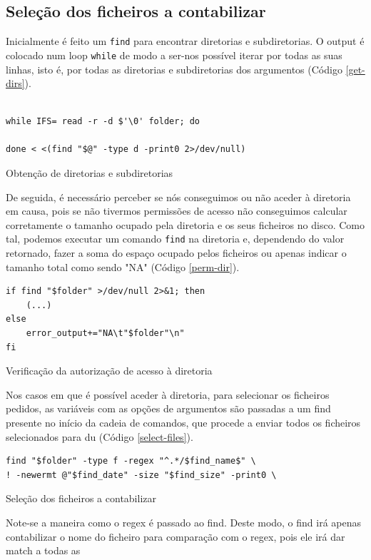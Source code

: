 \subsection{Seleção dos ficheiros a contabilizar}
Inicialmente é feito um \verb|find| para encontrar
diretorias e subdiretorias. O output é colocado num loop
\verb|while| de modo a ser-nos possível iterar por todas as
suas linhas, isto é, por todas as diretorias e
subdiretorias dos argumentos (Código \ref{get-dirs}).
\begin{listing}[H]
\begin{verbatim}

while IFS= read -r -d $'\0' folder; do 

done < <(find "$@" -type d -print0 2>/dev/null)
\end{verbatim}
\caption{Obtenção de diretorias e subdiretorias}
\label{get-dirs}
\end{listing}
De seguida, é necessário perceber se nós conseguimos ou não
aceder à diretoria em causa, pois se não tivermos permissões
de acesso não conseguimos calcular corretamente o tamanho
ocupado pela diretoria e os seus ficheiros no disco. Como
tal, podemos executar um comando \verb|find| na diretoria
e, dependendo do valor retornado, fazer a soma do espaço
ocupado pelos ficheiros ou apenas indicar o tamanho total
como sendo "NA" (Código \ref{perm-dir}).
\begin{listing}[H]
\begin{verbatim}
if find "$folder" >/dev/null 2>&1; then
    (...)
else
    error_output+="NA\t"$folder"\n"
fi
\end{verbatim}
\caption{Verificação da autorização de acesso à diretoria}
\label{perm-dir}
\end{listing}
Nos casos em que é possível aceder à diretoria, para
selecionar os ficheiros pedidos, as variáveis com as opções
de argumentos são passadas a um find presente no início da cadeia de comandos,
que procede a enviar todos os ficheiros selecionados para
du (Código \ref{select-files}).
\begin{listing}[H]
\begin{verbatim}
find "$folder" -type f -regex "^.*/$find_name$" \
! -newermt @"$find_date" -size "$find_size" -print0 \
\end{verbatim}
\caption{Seleção dos ficheiros a contabilizar}
\label{select-files}
\end{listing}
Note-se a maneira como o regex é passado ao find. Deste
modo, o find irá apenas contabilizar o nome do ficheiro para
comparação com o regex, pois ele irá dar match a todas as
